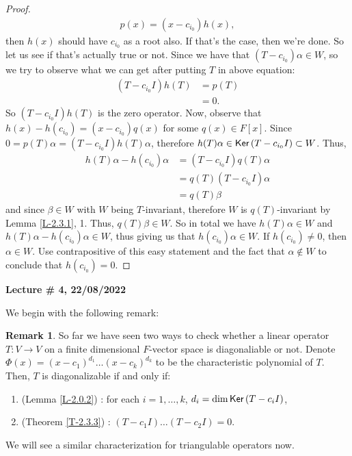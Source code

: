 \documentclass[letterpaper,11pt,twoside]{article}
\theoremstyle{definition}
\theoremstyle{definition}
\theoremstyle{definition}
\newtheorem{remark}[proposition]{\textbf{Remark}}
\theoremstyle{definition}
\theoremstyle{definition}
\theoremstyle{definition}
\theoremstyle{remark}
\theoremstyle{definition}
\newcommand{\Ker}[1]{{\fontfamily{lmss}\selectfont 
		\text{Ker}\left (#1\right )
}}
\newcommand{\newlecture}[2]{\begin{center}
    \textbf{Lecture \# #1, #2}
\end{center}}
\begin{document}
\begin{proof}
\begin{align*}
        p(x) = (x-c_{i_0})h(x),
    \end{align*}
    then $h(x)$ should have $c_{i_0}$ as a root also. If that's the case, then we're done. So let us see if that's actually true or not. Since we have that $(T-c_{i_0})\alpha \in W$, so we try to observe what we can get after putting $T$ in above equation:
    \begin{align*}
         (T-c_{i_0}I)h(T)&= p(T)\\
        &=0.
    \end{align*}
     So $(T-c_{i_0}I)h(T)$ is the zero operator. Now, observe that $h(x) - h(c_{i_0}) = (x-c_{i_0})q(x)$ for some $q(x) \in F[x]$. Since $0 = p(T)\alpha = (T-c_{i_0}I)h(T)\alpha$, therefore $h(T)\alpha \in \Ker{T-c_{i_0}I} \subset W$. Thus,
     \begin{align*}
         h(T)\alpha - h(c_{i_0})\alpha &= (T-c_{i_0}I)q(T)\alpha\\
         &= q(T) (T-c_{i_0}I)\alpha\\
         &= q(T)\beta
     \end{align*}
     and since $\beta\in W$ with $W$ being $T$-invariant, therefore $W$ is $q(T)$-invariant by Lemma \ref{L-2.3.1}, 1. Thus, $q(T)\beta \in W$. So in total we have $h(T)\alpha \in W$ and $h(T)\alpha - h(c_{i_0})\alpha \in W$, thus giving us that $h(c_{i_0})\alpha \in W$. If $h(c_{i_0})\neq 0$, then $\alpha\in W$. Use contrapositive of this easy statement and the fact that $\alpha\notin W$ to conclude that $h(c_{i_0}) = 0$. 
    \end{proof}
    \newlecture{4}{22/08/2022}
    We begin with the following remark:
    \begin{remark}
    So far we have seen two ways to check whether a linear operator $T : V\to V$ on a finite dimensional $F$-vector space is diagonaliable or not. Denote $\Phi(x) = (x-c_1)^{d_1}\dots (x-c_k)^{d_k}$ to be the characteristic polynomial of $T$. Then, $T$ is diagonalizable if and only if:
    \begin{enumerate}
        \item {(Lemma \ref{L-2.0.2}) : for each $i=1,\dots,k$, $d_i = \dim \Ker{T-c_iI}$,}
        \item {(Theorem \ref{T-2.3.3}) : $(T-c_1I)\dots (T-c_2I) = 0$.}
    \end{enumerate}
    We will see a similar characterization for triangulable operators now.
    \end{remark}
\end{document}
